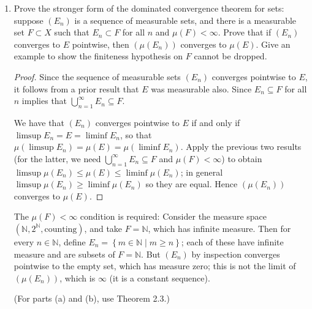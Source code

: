 \documentclass[11pt]{article}
\newcommand{\cbr}[1]{\left\{#1\right\}}
\begin{document}
\begin{enumerate}
\begin{enumerate}
\begin{proof}
\begin{align*}
                &= \limsup \mu(E_n)
            \end{align*} as desired.
        \end{proof}
        \item Prove the stronger form of the dominated convergence theorem for sets: suppose $(E_n)$ is a sequence of measurable sets, and there is a measurable set $F\subset X$ such that $E_n\subset F$ for all $n$ and $\mu(F)<\infty$. Prove that if $(E_n)$ converges to $E$ pointwise, then $(\mu(E_n))$ converges to $\mu(E)$. Give an example to show the finiteness hypothesis on $F$ cannot be dropped. \begin{proof}
            Since the sequence of measurable sets $(E_n)$ converges pointwise to $E$, it follows from a prior result that $E$ was measurable also. Since $E_n\subseteq F$ for all $n$ implies that $\bigcup_{n=1}^\infty E_n\subseteq F$.

            We have that $(E_n)$ converges pointwise to $E$ if and only if $\limsup E_n = E = \liminf E_n$, so that $\mu(\limsup E_n) = \mu(E) = \mu(\liminf E_n)$. Apply the previous two results (for the latter, we need $\bigcup_{n=1}^\infty E_n\subseteq F$ and $\mu(F)< \infty$) to obtain $\limsup \mu(E_n) \leq \mu(E) \leq \liminf \mu(E_n)$; in general $\limsup \mu(E_n)\geq \liminf \mu(E_n)$ so they are equal. Hence $(\mu(E_n))$ converges to $\mu(E)$.
        \end{proof}

        The $\mu(F)<\infty$ condition is required: Consider the measure space $(\mathbb{N}, 2^\mathbb{N}, \text{counting})$, and take $F = \mathbb{N}$, which has infinite measure. Then for every $n\in\mathbb{N}$, define $E_n = \cbr{m\in\mathbb{N}\mid m\geq n}$; each of these have infinite measure and are subsets of $F = \mathbb{N}$. But $(E_n)$ by inspection converges pointwise to the empty set, which has measure zero; this is not the limit of $(\mu(E_n))$, which is $\infty$ (it is a constant sequence).
        
        (For parts (a) and (b), use Theorem 2.3.)
    \end{enumerate}
\end{enumerate}
\end{document}
